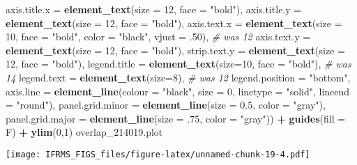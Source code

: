 \documentclass[
]{article}
\newenvironment{Shaded}{\begin{snugshade}}{\end{snugshade}}
\newcommand{\CommentTok}[1]{\textcolor[rgb]{0.56,0.35,0.01}{\textit{#1}}}
\newcommand{\DataTypeTok}[1]{\textcolor[rgb]{0.13,0.29,0.53}{#1}}
\newcommand{\DecValTok}[1]{\textcolor[rgb]{0.00,0.00,0.81}{#1}}
\newcommand{\FloatTok}[1]{\textcolor[rgb]{0.00,0.00,0.81}{#1}}
\newcommand{\KeywordTok}[1]{\textcolor[rgb]{0.13,0.29,0.53}{\textbf{#1}}}
\newcommand{\NormalTok}[1]{#1}
\newcommand{\OperatorTok}[1]{\textcolor[rgb]{0.81,0.36,0.00}{\textbf{#1}}}
\newcommand{\StringTok}[1]{\textcolor[rgb]{0.31,0.60,0.02}{#1}}
\begin{document}
\begin{Shaded}
\begin{Highlighting}[]
        \DataTypeTok{axis.title.x =} \KeywordTok{element_text}\NormalTok{(}\DataTypeTok{size =} \DecValTok{12}\NormalTok{, }\DataTypeTok{face =} \StringTok{"bold"}\NormalTok{),}
        \DataTypeTok{axis.title.y =} \KeywordTok{element_text}\NormalTok{(}\DataTypeTok{size =} \DecValTok{12}\NormalTok{, }\DataTypeTok{face =} \StringTok{"bold"}\NormalTok{),}
        \DataTypeTok{axis.text.x =} \KeywordTok{element_text}\NormalTok{(}\DataTypeTok{size =} \DecValTok{10}\NormalTok{, }\DataTypeTok{face =} \StringTok{"bold"}\NormalTok{, }\DataTypeTok{color =} \StringTok{"black"}\NormalTok{, }\DataTypeTok{vjust =} \FloatTok{.50}\NormalTok{), }\CommentTok{# was 12}
        \DataTypeTok{axis.text.y =} \KeywordTok{element_text}\NormalTok{(}\DataTypeTok{size =} \DecValTok{12}\NormalTok{, }\DataTypeTok{face =} \StringTok{"bold"}\NormalTok{),}
        \DataTypeTok{strip.text.y =} \KeywordTok{element_text}\NormalTok{(}\DataTypeTok{size =} \DecValTok{12}\NormalTok{, }\DataTypeTok{face =} \StringTok{"bold"}\NormalTok{),}
        \DataTypeTok{legend.title =} \KeywordTok{element_text}\NormalTok{(}\DataTypeTok{size=}\DecValTok{10}\NormalTok{, }\DataTypeTok{face =} \StringTok{"bold"}\NormalTok{), }\CommentTok{# was 14}
        \DataTypeTok{legend.text =} \KeywordTok{element_text}\NormalTok{(}\DataTypeTok{size=}\DecValTok{8}\NormalTok{), }\CommentTok{# was 12}
        \DataTypeTok{legend.position =} \StringTok{"bottom"}\NormalTok{,}
        \DataTypeTok{axis.line =} \KeywordTok{element_line}\NormalTok{(}\DataTypeTok{colour =} \StringTok{"black"}\NormalTok{, }
                                 \DataTypeTok{size =} \DecValTok{0}\NormalTok{, }\DataTypeTok{linetype =} \StringTok{"solid"}\NormalTok{, }\DataTypeTok{lineend =} \StringTok{"round"}\NormalTok{),}
        \DataTypeTok{panel.grid.minor =} \KeywordTok{element_line}\NormalTok{(}\DataTypeTok{size =} \FloatTok{0.5}\NormalTok{, }\DataTypeTok{color =} \StringTok{"gray"}\NormalTok{), }
        \DataTypeTok{panel.grid.major =} \KeywordTok{element_line}\NormalTok{(}\DataTypeTok{size =} \FloatTok{.75}\NormalTok{, }\DataTypeTok{color =} \StringTok{"gray"}\NormalTok{)) }\OperatorTok{+}\StringTok{ }
\StringTok{  }\KeywordTok{guides}\NormalTok{(}\DataTypeTok{fill =}\NormalTok{ F) }\OperatorTok{+}\StringTok{ }
\StringTok{  }\KeywordTok{ylim}\NormalTok{(}\DecValTok{0}\NormalTok{,}\DecValTok{1}\NormalTok{) }
\NormalTok{overlap_}\FloatTok{214019.}\NormalTok{plot}
\end{Highlighting}
\end{Shaded}

\texttt{[image: IFRMS\_FIGS\_files/figure-latex/unnamed-chunk-19-4.pdf]}
\end{document}
